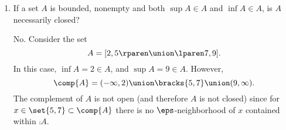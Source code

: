 \documentclass{article}
\begin{document}
\begin{enumerate}
\begin{proof}[Infimum]
          Now, assume $\inf A \notin A$. Then, $\inf A < a$ for all $a \in A$ and thus by Theorem~1.24
          there exists an $\eps_{1} > 0$ such that there is an $a_{1} \in A$ where
          \[ \inf A < a_{1} < \inf A + \eps_{1}. \]
          Now, we may define $a_{n + 1}$ for each $n \in \N$. Let $\eps_{n + 1} = a_{n} - \inf A > 0$,
          and then find $a_{n + 1} \in A$ (again by Theorem~1.24) such that
          \[ \inf A < a_{n + 1} < \inf A + \eps_{n + 1} = a_{n}. \]
          Hence, we find a sequence $\parens{a_{n}} \subseteq A$ monotonically decreasing, bounded below by $\inf A$ which is
          \emph{by definition} the infimum of this sequence (as $(\eps_{n}) \to 0$)
          and therefore by MCT converges to $\inf A$.
        \end{proof}



  \item If a set $A$ is bounded, nonempty and both $\sup A \in A$ and $\inf A \in A$, is $A$ necessarily closed?

        No. Consider the set
        \[ A = \lbrack 2, 5 \rparen \union \lparen 7, 9 \rbrack. \]
        In this case, $\inf A = 2 \in A$, and $\sup A = 9 \in A$.
        However,
        \[ \comp{A} = (-\infty, 2) \union \bracks{5, 7} \union (9, \infty). \]
        The complement of $A$ is not open (and therefore $A$ is not closed)
        since for $x \in \set{5, 7} \subset \comp{A}$ there is no $\eps$-neighborhood of $x$ contained within $\comp{A}$.

\end{enumerate}
\end{document}
